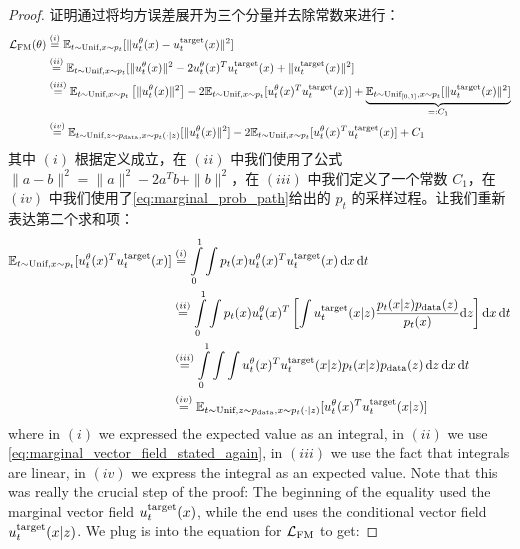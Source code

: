 \begin{proof}
证明通过将均方误差展开为三个分量并去除常数来进行：
\begin{align*}
    \mathcal{L}_{\text{FM}}(\theta)&\overset{(i)}{=}\mathbb{E}_{t\sim\text{Unif},x\sim p_t}[\|u_t^\theta(x) - u^{\text{target}}_t(x)\|^2]\\
    &\overset{(ii)}{=}\mathbb{E}_{t\sim\text{Unif},x\sim p_t}[\|u_t^\theta(x)\|^2 - 2u_t^\theta(x)^Tu^{\text{target}}_t(x) + \|u^{\text{target}}_t(x)\|^2]\\
    &\overset{(iii)}{=}\mathbb{E}_{t\sim\text{Unif},x\sim p_t}\left[\|u_t^\theta(x)\|^2\right] - 2\mathbb{E}_{t\sim\text{Unif},x\sim p_t}[u_t^\theta(x)^Tu^{\text{target}}_t(x)] + \underbrace{\mathbb{E}_{t\sim\text{Unif}_{[0,1]}, x\sim p_t}[\|u^{\text{target}}_t(x)\|^2]}_{=:C_1}\\
    &\overset{(iv)}{=}\mathbb{E}_{t\sim\text{Unif},z\sim p_{\rm{data}}, x\sim p_t(\cdot|z)}[\|u_t^\theta(x)\|^2] - 2\mathbb{E}_{t\sim\text{Unif},x\sim p_t}[u_t^\theta(x)^Tu^{\text{target}}_t(x)] + C_1
\end{align*}
其中 $(i)$ 根据定义成立，在 $(ii)$ 中我们使用了公式 $\|a-b\|^2=\|a\|^2-2a^Tb+\|b\|^2$，在 $(iii)$ 中我们定义了一个常数 $C_1$，在 $(iv)$ 中我们使用了\cref{eq:marginal_prob_path}给出的 $p_t$ 的采样过程。让我们重新表达第二个求和项：
\begin{align*}
\mathbb{E}_{t\sim\text{Unif},x\sim p_t}[u_t^\theta(x)^Tu^{\text{target}}_t(x)]&\overset{(i)}{=}\int\limits_{0}^{1}\int p_t(x)u_t^\theta(x)^Tu^{\text{target}}_t(x)\,\mathrm{d} x\, \mathrm{d} t\\
&\overset{(ii)}{=}\int\limits_{0}^{1}\int p_t(x)u_t^\theta(x)^T\left[\int u^{\text{target}}_t(x|z)\frac{ p_t(x|z)p_{\rm{data}}(z)}{p_t(x)}\mathrm{d} z\right]\mathrm{d} x\, \mathrm{d} t\\
&\overset{(iii)}{=}\int\limits_{0}^{1}\int\int u_t^\theta(x)^Tu^{\text{target}}_t(x|z) p_t(x|z)p_{\rm{data}}(z)\,\mathrm{d} z\,\mathrm{d} x\, \mathrm{d} t\\
&\overset{(iv)}{=}\mathbb{E}_{t\sim\text{Unif},z\sim p_{\rm{data}}, x\sim p_t(\cdot|z)}[u_t^\theta(x)^Tu^{\text{target}}_t(x|z)]
\end{align*}
where in $(i)$ we expressed the expected value as an integral, in $(ii)$ we use \cref{eq:marginal_vector_field_stated_again}, in $(iii)$ we use the fact that integrals are linear, in $(iv)$ we express the integral as an expected value. Note that this was really the crucial step of the proof: The beginning of the equality used the marginal vector field $u^{\text{target}}_t(x)$, while the end uses the conditional vector field $u^{\text{target}}_t(x|z)$. We plug is into the equation for $\mathcal{L}_{\text{FM}}$ to get:


\end{proof}
